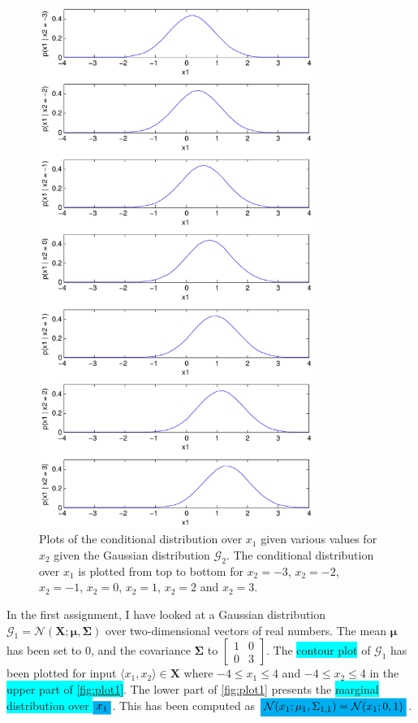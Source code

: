\documentclass[a4paper,11pt]{article}
\newcommand{\V}[1]{\ensuremath{\boldsymbol{#1}}}
\newcommand{\mean}{\ensuremath{\boldsymbol{\mu}}}
\newcommand{\cov}{\ensuremath{\boldsymbol{\Sigma}}}
\newcommand{\npdf}{\ensuremath{\mathcal{N}}}
\newcommand{\hl}[1]{\colorbox{cyan}{#1}}
\newcommand{\mhl}[1]{\mathchoice%
  {\colorbox{cyan}{$\displaystyle#1$}}%
  {\colorbox{cyan}{$\textstyle#1$}}%
  {\colorbox{cyan}{$\scriptstyle#1$}}%
  {\colorbox{cyan}{$\scriptscriptstyle#1$}}}
\begin{document}
\begin{figure}
  \begin{center}
    \caption{Plots of the conditional distribution over $x_1$ given various values for $x_2$ given the Gaussian distribution $\mathcal G_2$.  The conditional distribution over $x_1$ is plotted from top to bottom for $x_2 = -3$, $x_2 = -2$, $x_2 = -1$, $x_2 = 0$, $x_2 = 1$, $x_2 = 2$ and $x_2 = 3$.}
    \label{fig:plot4}
    \includegraphics[width=0.8\textwidth]{ex1plot4}
  \end{center}
\end{figure}


In the first assignment, I have looked at a Gaussian distribution $\mathcal G_1 = \npdf(\V{X}; \mean, \cov)$ over two-dimensional vectors of real numbers.  The mean $\mean$ has been set to $0$, and the covariance $\cov$ to $\begin{bmatrix}1&0\\0&3\end{bmatrix}$.  The \hl{contour plot} of $\mathcal G_1$ has been plotted for input $\langle x_1, x_2 \rangle \in \V{X}$ where $-4 \leq x_1 \leq 4$ and $-4 \leq x_2 \leq 4$ in the \hl{upper part of \autoref{fig:plot1}}.  The lower part of \autoref{fig:plot1} presents the \hl{marginal distribution over }$\mhl{x_1}$.  This has been computed as $\mhl{\npdf(x_1; \mu_1, \Sigma_{1,1}) = \npdf(x_1; 0, 1)}$. 
\end{document}
